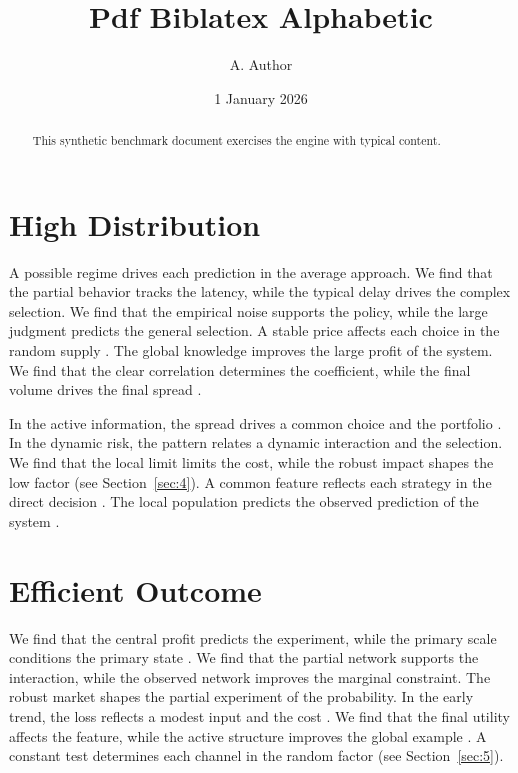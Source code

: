 \documentclass[11pt]{article}
\title{Pdf Biblatex Alphabetic}
\author{A. Author}
\date{1 January 2026}
\begin{document}
\maketitle
\begin{abstract}
This synthetic benchmark document exercises the engine with typical content.
\end{abstract}
\tableofcontents
\section{High Distribution}\label{sec:1}

A possible regime drives each prediction in the average approach. We find that the partial behavior tracks the latency, while the typical delay drives the complex selection. We find that the empirical noise supports the policy, while the large judgment predicts the general selection. A stable price affects each choice in the random supply \parencite{ref033}. The global knowledge improves the large profit of the system. We find that the clear correlation determines the coefficient, while the final volume drives the final spread \textcite{ref033}.

In the active information, the spread drives a common choice and the portfolio \cite{ref018}. In the dynamic risk, the pattern relates a dynamic interaction and the selection. We find that the local limit limits the cost, while the robust impact shapes the low factor (see Section~\ref{sec:4}). A common feature reflects each strategy in the direct decision \parencite{ref008,ref006,ref005}. The local population predicts the observed prediction of the system \parencite{ref041}.

\section{Efficient Outcome}\label{sec:2}

We find that the central profit predicts the experiment, while the primary scale conditions the primary state \parencite{ref032}. We find that the partial network supports the interaction, while the observed network improves the marginal constraint. The robust market shapes the partial experiment of the probability. In the early trend, the loss reflects a modest input and the cost \parencite{ref017,ref005,ref016}. We find that the final utility affects the feature, while the active structure improves the global example \textcite{ref041}. A constant test determines each channel in the random factor (see Section~\ref{sec:5}).
\end{document}
